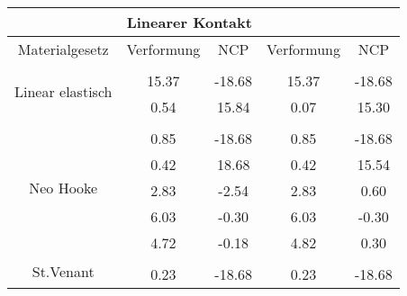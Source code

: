 \begin{table} 
\centering 
\begin{tabular}{c|cc|cc|} 
\cline{2-5} 
 & \multicolumn{2}{|c|}{Linearer Kontakt} &  \\ 
\hline 
\multicolumn{1}{|c|}{Materialgesetz} & \multicolumn{1}{c|}{Verformung} & \multicolumn{1}{c|}{NCP} & \multicolumn{1}{c|}{Verformung} & \multicolumn{1}{c|}{NCP} \\ 
\hline 
\multicolumn{1}{|c|}{\multirow{3}{*}{Linear elastisch}} &\multicolumn{1}{|c|}{} & \multicolumn{1}{|c|}{} & \multicolumn{1}{|c|}{} & \multicolumn{1}{|c|}{} \\ 
\multicolumn{1}{|c|}{} & \multicolumn{1}{|c|}{     15.37} & \multicolumn{1}{|c|}{    -18.68} & \multicolumn{1}{|c|}{     15.37} & \multicolumn{1}{|c|}{    -18.68} \\ 
\multicolumn{1}{|c|}{} & \multicolumn{1}{|c|}{      0.54} & \multicolumn{1}{|c|}{     15.84} & \multicolumn{1}{|c|}{      0.07} & \multicolumn{1}{|c|}{     15.30} \\ 
\hline 
\multicolumn{1}{|c|}{\multirow{6}{*}{Neo Hooke}} &\multicolumn{1}{|c|}{} & \multicolumn{1}{|c|}{} & \multicolumn{1}{|c|}{} & \multicolumn{1}{|c|}{} \\ 
\multicolumn{1}{|c|}{} & \multicolumn{1}{|c|}{      0.85} & \multicolumn{1}{|c|}{    -18.68} & \multicolumn{1}{|c|}{      0.85} & \multicolumn{1}{|c|}{    -18.68} \\ 
\multicolumn{1}{|c|}{} & \multicolumn{1}{|c|}{      0.42} & \multicolumn{1}{|c|}{     18.68} & \multicolumn{1}{|c|}{      0.42} & \multicolumn{1}{|c|}{     15.54} \\ 
\multicolumn{1}{|c|}{} & \multicolumn{1}{|c|}{      2.83} & \multicolumn{1}{|c|}{     -2.54} & \multicolumn{1}{|c|}{      2.83} & \multicolumn{1}{|c|}{      0.60} \\ 
\multicolumn{1}{|c|}{} & \multicolumn{1}{|c|}{      6.03} & \multicolumn{1}{|c|}{     -0.30} & \multicolumn{1}{|c|}{      6.03} & \multicolumn{1}{|c|}{     -0.30} \\ 
\multicolumn{1}{|c|}{} & \multicolumn{1}{|c|}{      4.72} & \multicolumn{1}{|c|}{     -0.18} & \multicolumn{1}{|c|}{      4.82} & \multicolumn{1}{|c|}{      0.30} \\ 
\hline 
\multicolumn{1}{|c|}{\multirow{6}{*}{St.Venant}} &\multicolumn{1}{|c|}{} & \multicolumn{1}{|c|}{} & \multicolumn{1}{|c|}{} & \multicolumn{1}{|c|}{} \\ 
\multicolumn{1}{|c|}{} & \multicolumn{1}{|c|}{      0.23} & \multicolumn{1}{|c|}{    -18.68} & \multicolumn{1}{|c|}{      0.23} & \multicolumn{1}{|c|}{    -18.68} \\ 

\end{tabular}
\end{table}
